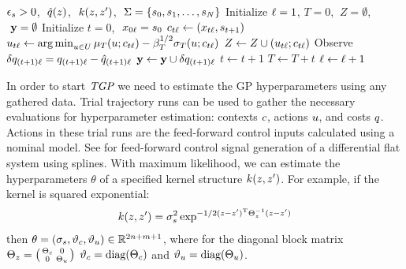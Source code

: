 \begin{algorithm}[tb]
   \caption{\alg}
   \label{alg1}
\begin{algorithmic}
    $\epsilon_s > 0$, $\ \hat{q}(z)$, $\ k(z,z')$, $\ \Sigma = \{s_0, s_1, \ldots, s_N \}$
   \STATE Initialize $\ell = 1$, $T = 0$, $\ Z = \emptyset$, $\ \mathbf{y} = \emptyset$
   \REPEAT 
	   \STATE Initialize $t = 0$, $\ x_{0\ell} = s_{0}$
   	   \REPEAT
   	   		\STATE $c_{t\ell} \leftarrow (x_{t\ell}, s_{t+1})$
   	   		\STATE $u_{t\ell} \leftarrow \operatorname*{arg\,min}_{u \in U} \mu_T(u;c_{t\ell}) - \beta_T^{1/2}\sigma_T(u;c_{t\ell})$
   	   		\STATE $Z \leftarrow Z \cup (u_{t\ell}; c_{t\ell})$
   	   		\STATE Observe $\delta q_{(t+1)\ell} = q_{(t+1)\ell} - \hat{q}_{(t+1)\ell}$
   	   		\STATE $\mathbf{y} \leftarrow \mathbf{y} \cup \delta q_{(t+1)\ell}$
   	   		\STATE $t \leftarrow t + 1$
   	   \STATE $T \leftarrow T + t$
   	   \STATE $\ell \leftarrow \ell + 1$
\end{algorithmic}
\end{algorithm}

In order to start $\emph{TGP}$ we need to estimate the GP hyperparameters using any gathered data. Trial trajectory runs can be used to gather the necessary evaluations for hyperparameter estimation: contexts $c$, actions $u$, and costs $q$. Actions in these trial runs are the feed-forward control inputs calculated using a nominal model. See \cite{Schoellig12} for feed-forward control signal generation of a differential flat system using splines. With maximum likelihood, we can estimate the hyperparameters $\theta$ of a specified kernel structure $k(z,z')$. For example, if the kernel is squared exponential:
\begin{align*}
k(\ctxaction,\ctxaction') = \sigma_s^{2}\exp^{-1/2(\ctxaction - \ctxaction')^{\mathrm{T}}\Theta_{\ctxaction}^{-1}(\ctxaction - \ctxaction')} %
\end{align*}
then $\theta = (\sigma_s, \vartheta_{c}, \vartheta_{u}) \in \mathbb{R}^{2n+m+1}$, where for the diagonal block matrix $\Theta_{z} = \bigl(\begin{smallmatrix} \Theta_{c}&0 \\ 0&\Theta_{u} \end{smallmatrix} \bigr)$ $\vartheta_{c} = \text{diag}(\Theta_{c})$ and $\vartheta_{u} = \text{diag}(\Theta_{u})$. 

